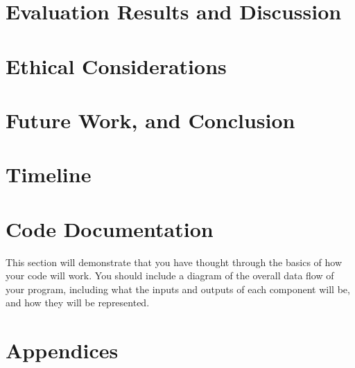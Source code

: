 \documentclass[10pt,twocolumn]{article}
\begin{document}
\section{Evaluation Results and Discussion}


\section{Ethical Considerations}


\section{Future Work, and Conclusion}

\section{Timeline}


\section{Code Documentation}

This section will demonstrate that you have thought through the basics of how your code will work. You should include a diagram of the overall data flow of your program, including what the inputs and outputs of each component will be, and how they will be represented.

\section{Appendices}

\printbibliography
\end{document}
